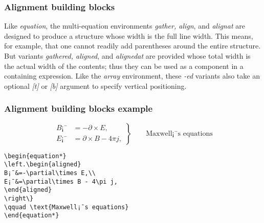 \documentclass[12pt]{beamer}
\begin{document}
\begin{frame}
  \frametitle{Alignment building blocks}
  Like \emph{equation}, the multi-equation environments \emph{gather, align}, and \emph{alignat} are designed to produce a structure whose width is the full line width. This means, for example, that one cannot readily add parentheses around the entire structure. But variants \emph{gathered, aligned}, and \emph{alignedat} are provided whose total width is the actual width of the contents; thus they can be used as a component in a containing expression. Like the \emph{array} environment, these \emph{-ed} variants also take an optional \emph{[t]} or \emph{[b]} argument to specify vertical positioning.\\
\end{frame}

\begin{frame}[fragile]
  \frametitle{Alignment building blocks example}
  \small{\begin{equation*}
    \left.\begin{aligned}
    B¡¯&=-\partial\times E,\\
    E¡¯&=\partial\times B - 4\pi j,
    \end{aligned}
    \right\}
\qquad \text{Maxwell¡¯s equations}
\end{equation*}
  }
  \small{\begin{verbatim}
\begin{equation*}
\left.\begin{aligned}
B¡¯&=-\partial\times E,\\
E¡¯&=\partial\times B - 4\pi j,
\end{aligned}
\right\}
\qquad \text{Maxwell¡¯s equations}
\end{equation*}
  \end{verbatim}
  }
\end{frame}
\end{document}
